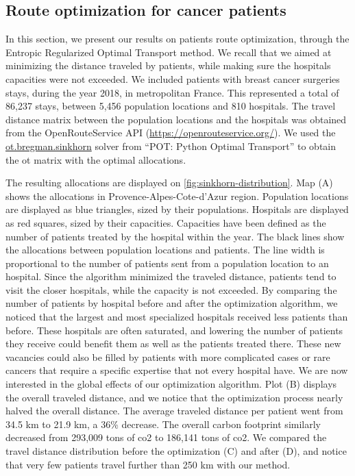 \subsection{Route optimization for cancer patients}

In this section, we present our results on patients route optimization, through
the Entropic Regularized Optimal Transport method. We recall that we aimed at
minimizing the distance traveled by patients, while making sure the hospitals
capacities were not exceeded. We included patients with breast cancer surgeries
stays, during the year 2018, in metropolitan France. This represented a total of
86,237 stays, between 5,456 population locations and 810 hospitals. The travel
distance matrix between the population locations and the hospitals was obtained
from the OpenRouteService API (\url{https://openrouteservice.org/}). We used the
\href{https://pythonot.github.io/gen_modules/ot.bregman.html#ot.bregman.sinkhorn}{ot.bregman.sinkhorn}
solver from ``POT: Python Optimal Transport'' \cite{flamary_pot_2021} to obtain
the \ac{ot} matrix with the optimal allocations.

The resulting allocations are displayed on \cref{fig:sinkhorn-distribution}. Map
(A) shows the allocations in Provence-Alpes-Cote-d'Azur region. Population
locations are displayed as blue triangles, sized by their populations. Hospitals
are displayed as red squares, sized by their capacities. Capacities have been
defined as the number of patients treated by the hospital within the year. The
black lines show the allocations between population locations and patients. The
line width is proportional to the number of patients sent from a population
location to an hospital. Since the algorithm minimized the traveled distance,
patients tend to visit the closer hospitals, while the capacity is not exceeded.
By comparing the number of patients by hospital before and after the
optimization algorithm, we noticed that the largest and most specialized
hospitals received less patients than before. These hospitals are often
saturated, and lowering the number of patients they receive could benefit them
as well as the patients treated there. These new vacancies could also be filled
by patients with more complicated cases or rare cancers that require a specific
expertise that not every hospital have. We are now interested in the global
effects of our optimization algorithm. Plot (B) displays the overall traveled
distance, and we notice that the optimization process nearly halved the overall
distance. The average traveled distance per patient went from 34.5 km to 21.9
km, a 36\% decrease. The overall carbon footprint similarly decreased from
293,009 tons of \ac{co2} to 186,141 tons of \ac{co2}. We compared the travel distance distribution before the optimization
(C) and after (D), and notice that very few patients travel further than 250
km with our method.


